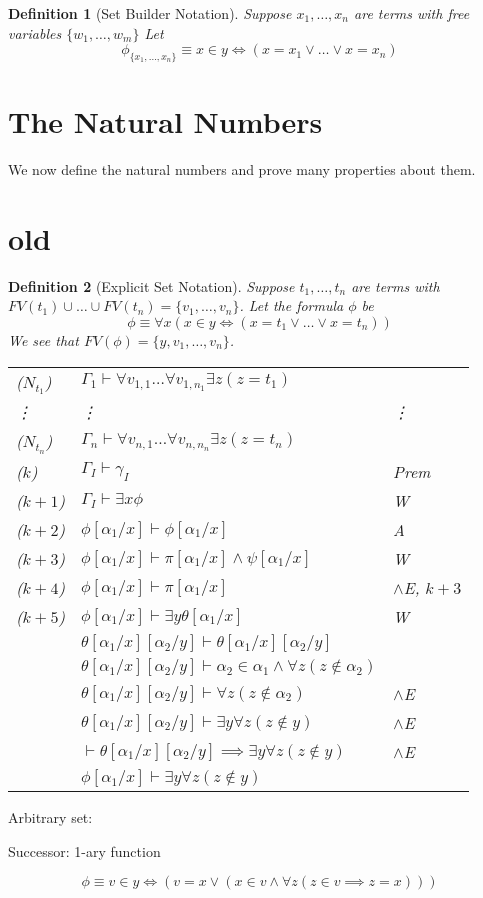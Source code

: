 \documentclass[12pt]{article}
\theoremstyle{break}
\newtheorem{definition}{Definition}[section]
\theoremstyle{break}
\theoremstyle{break}
\theoremstyle{break}
\theoremstyle{break}
\newtheorem{informal definition}[definition]{Informal Definition}
\begin{document}
\begin{definition}[Set Builder Notation]
Suppose $x_1,\ldots, x_n$ are terms with free variables $\{w_1, \ldots, w_m\}$
Let
$$
\phi_{\{x_1, \ldots, x_n\}} \equiv x \in y \iff (x = x_1 \lor \ldots \lor x = x_n)
$$


\end{definition}


\section{The Natural Numbers}

We now define the natural numbers and prove many properties about them.




\section{old}
\begin{definition}[Explicit Set Notation]
Suppose $t_1,\ldots, t_n$ are terms with $FV(t_1)\cup\ldots \cup FV(t_n) = \{v_1, \ldots, v_n\}$.
Let the formula $\phi$ be
$$
\phi \equiv \forall x (x\in y \iff (x=t_1 \lor \ldots \lor x=t_n))
$$
We see that $FV(\phi) = \{y, v_1,\ldots, v_n\}$.

\begin{center}
\begin{tabular}{ p{2cm} p{8cm} p{3cm} }
($N_{t_1}$) & $\Gamma_1 \vdash \forall v_{1,1} \ldots \forall v_{1,n_1}\exists z (z=t_1)$ & \\
\vdots & \vdots & \vdots \\
($N_{t_n}$) & $\Gamma_n \vdash \forall v_{n,1} \ldots \forall v_{n,n_n}\exists z (z=t_n)$ & \\
($k$) & $\Gamma_I \vdash \gamma_I$ & Prem \\
($k+1$) & $\Gamma_I \vdash \exists x \phi$ & W \\
($k+2$) & $\phi[\alpha_1/x] \vdash \phi[\alpha_1/x]$ & A \\
($k+3$) & $\phi[\alpha_1/x] \vdash \pi[\alpha_1/x]\land \psi[\alpha_1/x]$ & W \\
($k+4$) & $\phi[\alpha_1/x] \vdash \pi[\alpha_1/x]$ & $\land$E, $k+3$\\
($k+5$) & $\phi[\alpha_1/x] \vdash \exists y \theta[\alpha_1/x]$ & W \\
&$\theta[\alpha_1/x][\alpha_2/y] \vdash \theta[\alpha_1/x][\alpha_2/y]$ & \\
&$\theta[\alpha_1/x][\alpha_2/y] \vdash \alpha_2\in \alpha_1 \land \forall z(z\not\in \alpha_2)$ & \\
&$\theta[\alpha_1/x][\alpha_2/y] \vdash \forall z(z\not\in \alpha_2)$ & $\land$E \\
&$\theta[\alpha_1/x][\alpha_2/y] \vdash \exists y \forall z(z\not\in y)$ & $\land$E \\
& $\vdash \theta[\alpha_1/x][\alpha_2/y] \implies \exists y \forall z(z\not\in y)$ & $\land$E \\
& $\phi[\alpha_1/x] \vdash \exists y \forall z (z\not \in y)$ & \\
\end{tabular}
\end{center}
\end{definition}

Arbitrary set:



Successor: 1-ary function

$$
\phi \equiv v \in y \iff (v=x \lor (x\in v \land \forall z (z\in v \implies z=x)))
$$
\end{document}
